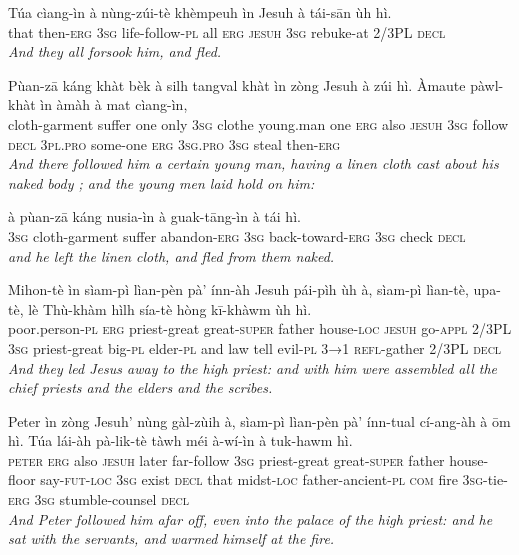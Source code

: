 \documentclass[11pt,a4paper]{article}
\begin{document}
\begin{exe}
\gll Túa cìang-ìn à nùng-zúi-tè khèmpeuh ìn Jesuh à tái-sān ùh hì. \\
     that then-\textsc{erg} \textsc{3sg} life-follow-\textsc{pl} all \textsc{erg} \textsc{jesuh} \textsc{3sg} rebuke-at 2/3PL \textsc{decl} \\
\glt \textcolor{kjvcolor}{\textit{And they all forsook him, and fled.}}

\gll Pùan-zā káng khàt bèk à silh tangval khàt ìn zòng Jesuh à zúi hì. Àmaute pàwl-khàt ìn àmàh à mat cìang-ìn, \\
     cloth-garment suffer one only \textsc{3sg} clothe young.man one \textsc{erg} also \textsc{jesuh} \textsc{3sg} follow \textsc{decl} \textsc{3pl}.\textsc{pro} some-one \textsc{erg} \textsc{3sg}.\textsc{pro} \textsc{3sg} steal then-\textsc{erg} \\
\glt \textcolor{kjvcolor}{\textit{And there followed him a certain young man, having a linen cloth cast about his naked body ; and the young men laid hold on him:}}

\gll à pùan-zā káng nusia-ìn à guak-tāng-ìn à tái hì. \\
     \textsc{3sg} cloth-garment suffer abandon-\textsc{erg} \textsc{3sg} back-toward-\textsc{erg} \textsc{3sg} check \textsc{decl} \\
\glt \textcolor{kjvcolor}{\textit{and he left the linen cloth, and fled from them naked.}}

\gll Mihon-tè ìn sìam-pì lìan-pèn pà' ínn-àh Jesuh pái-pìh ùh à, sìam-pì lìan-tè, upa-tè, lè Thù-khàm hìlh sía-tè hòng kī-khàwm ùh hì. \\
     poor.person-\textsc{pl} \textsc{erg} priest-great great-\textsc{super} father house-\textsc{loc} \textsc{jesuh} go-\textsc{appl} 2/3PL \textsc{3sg} priest-great big-\textsc{pl} elder-\textsc{pl} and law tell evil-\textsc{pl} \textsc{3→1} \textsc{refl}-gather 2/3PL \textsc{decl} \\
\glt \textcolor{kjvcolor}{\textit{And they led Jesus away to the high priest: and with him were assembled all the chief priests and the elders and the scribes.}}

\gll Peter ìn zòng Jesuh' nùng gàl-zùih à, sìam-pì lìan-pèn pà' ínn-tual cí-ang-àh à ōm hì. Túa lái-àh pà-lik-tè tàwh méi à-wí-ìn à tuk-hawm hì. \\
     \textsc{peter} \textsc{erg} also \textsc{jesuh} later far-follow \textsc{3sg} priest-great great-\textsc{super} father house-floor say-\textsc{fut}-\textsc{loc} \textsc{3sg} exist \textsc{decl} that midst-\textsc{loc} father-ancient-\textsc{pl} \textsc{com} fire \textsc{3sg}-tie-\textsc{erg} \textsc{3sg} stumble-counsel \textsc{decl} \\
\glt \textcolor{kjvcolor}{\textit{And Peter followed him afar off, even into the palace of the high priest: and he sat with the servants, and warmed himself at the fire.}}


\end{exe}
\end{document}
